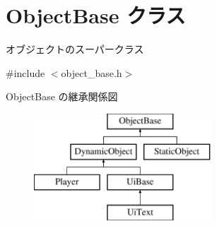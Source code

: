 \hypertarget{class_object_base}{}\section{Object\+Base クラス}
\label{class_object_base}


オブジェクトのスーパークラス  




{\ttfamily \#include $<$object\+\_\+base.\+h$>$}

Object\+Base の継承関係図\begin{figure}[H]
\begin{center}
\leavevmode
\includegraphics[height=4.000000cm]{class_object_base}
\end{center}
\end{figure}
